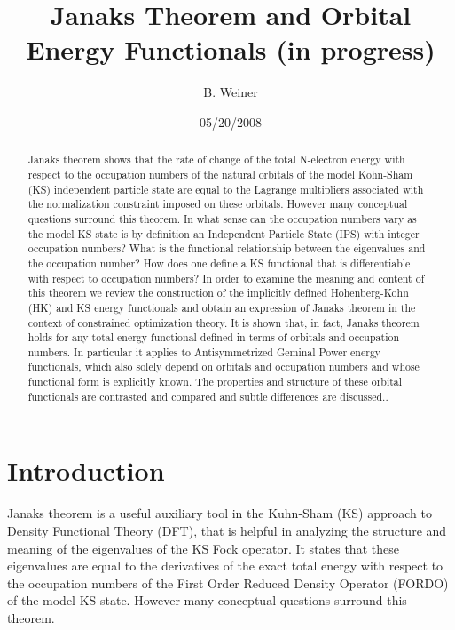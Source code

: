 \documentclass[aps,preprint]{revtex4}%
\begin{document}
\preprint{ }
\title[Janaks Theorem]{Janaks Theorem and Orbital Energy Functionals (in progress)}
\author{B. Weiner}
\keywords{}
\pacs{}

\begin{abstract}
Janaks theorem shows that the rate of change of the total N-electron energy
with respect to the occupation numbers of the natural orbitals of the model
Kohn-Sham (KS) independent particle state are equal to the Lagrange
multipliers associated with the normalization constraint imposed on these
orbitals. However many conceptual questions surround this theorem. In what
sense can the occupation numbers vary as the model KS state is by definition
an Independent Particle State (IPS) with integer occupation numbers? What is
the functional relationship between the eigenvalues and the occupation number?
How does one define a KS functional that is differentiable with respect to
occupation numbers? In order to examine the meaning and content of this
theorem we review the construction of the implicitly defined Hohenberg-Kohn
(HK) and KS energy functionals and obtain an expression of Janaks theorem in
the context of constrained optimization theory. It is shown that, in fact,
Janaks theorem holds for any total energy functional defined in terms of
orbitals and occupation numbers. In particular it applies to Antisymmetrized
Geminal Power energy functionals, which also solely depend on orbitals and
occupation numbers and whose functional form is explicitly known. The
properties and structure of these orbital functionals are contrasted and
compared and subtle differences are discussed..\qquad

\end{abstract}
\date{05/20/2008}
\maketitle
\tableofcontents


\section{Introduction\label{Intro}}

Janaks theorem \cite{Janak1978} is a useful auxiliary tool in the Kuhn-Sham
(KS) \cite{KS1965} approach to Density Functional Theory (DFT), that is
helpful in analyzing the structure and meaning of the eigenvalues of the KS
Fock operator. It states that these eigenvalues are equal to the derivatives
of the exact total energy with respect to the occupation numbers of the First
Order Reduced Density Operator (FORDO) of the model KS state. However many
conceptual questions surround this theorem.
\end{document}
